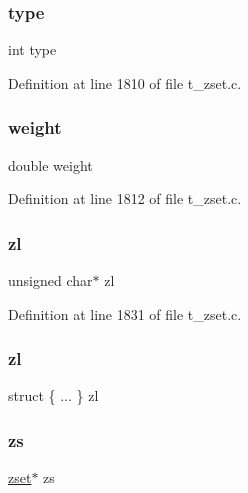 \subsubsection{\texorpdfstring{type}{type}}
{\footnotesize\ttfamily int type}



Definition at line 1810 of file t\+\_\+zset.\+c.

\mbox{\label{structzsetopsrc_a99108733d00274978a4979dc072bd513}} 
\subsubsection{\texorpdfstring{weight}{weight}}
{\footnotesize\ttfamily double weight}



Definition at line 1812 of file t\+\_\+zset.\+c.

\mbox{\label{structzsetopsrc_a1ae48f85ded0fe46acd8864ac807f6b8}} 
\subsubsection{\texorpdfstring{zl}{zl}\hspace{0.1cm}{\footnotesize\ttfamily [1/2]}}
{\footnotesize\ttfamily unsigned char$\ast$ zl}



Definition at line 1831 of file t\+\_\+zset.\+c.

\mbox{\label{structzsetopsrc_a1e59c58aa883d968f1b76dda5007f997}} 
\subsubsection{\texorpdfstring{zl}{zl}\hspace{0.1cm}{\footnotesize\ttfamily [2/2]}}
{\footnotesize\ttfamily struct \{ ... \}   zl}

\mbox{\label{structzsetopsrc_acfaaf23971feb28907603a957a249d76}} 
\subsubsection{\texorpdfstring{zs}{zs}}
{\footnotesize\ttfamily \hyperlink{structzset}{zset}$\ast$ zs}



